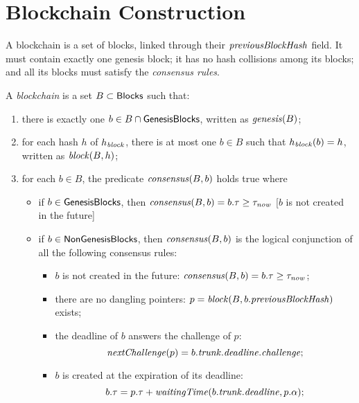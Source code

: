 \section{Blockchain Construction}\label{sec:blockchain_construction}

A blockchain is a set of blocks, linked through their ${\mathit{previousBlockHash}}$ field.
It must contain exactly one genesis block; it has no hash collisions among its blocks;
and all its blocks must satisfy the \emph{consensus rules}.
%
\begin{definition}\label{def:blockchain}
  A \emph{blockchain} is a set $B\subset{\mathsf{Blocks}}$ such that:
  \begin{enumerate}
  \item there is exactly one $b\in B\cap{\mathsf{GenesisBlocks}}$, written as ${\mathit{genesis}}(B)$;
  \item for each hash $h$ of $h_{\mathit{block}}$, there is at most
    one $b\in B$ such that $h_{\mathit{block}}(b)=h$, written as ${\mathit{block}}(B,h)$;
  \item for each $b\in B$, the predicate ${\mathit{consensus}}(B,b)$ holds true
    where
    \begin{itemize}
    \item if $b\in{\mathsf{GenesisBlocks}}$, then ${\mathit{consensus}}(B,b)=b.\tau\ge\tau_{\mathit{now}}$ [$b$ is not created in the future]
    \item if $b\in{\mathsf{NonGenesisBlocks}}$, then ${\mathit{consensus}}(B,b)$ is the logical conjunction
      of all the following consensus rules:
      \begin{itemize}
      \item $b$ is not created in the future:
        ${\mathit{consensus}}(B,b)=b.\tau\ge\tau_{\mathit{now}}$;
      \item there are no dangling pointers:
        $p={\mathit{block}}(B,b.{\mathit{previousBlockHash}})$ exists;
      \item the deadline of $b$ answers the challenge of $p$:
        \[
        {\mathit{nextChallenge}}(p)=b.{\mathit{trunk}}.{\mathit{deadline}}.{\mathit{challenge}};
        \]
      \item $b$ is created at the expiration of its deadline:
        \[
        b.\tau=p.\tau+{\mathit{waitingTime}}(b.{\mathit{trunk}}.{\mathit{deadline}},p.\alpha);
        \]
      \end{itemize}
    \end{itemize}
  \end{enumerate}
\end{definition}
